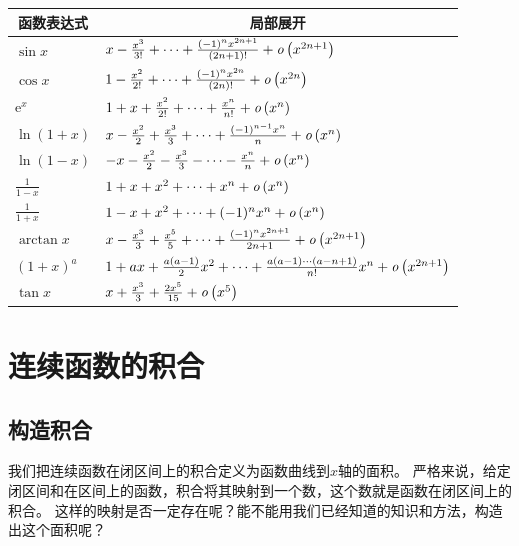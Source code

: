 \documentclass[12pt,UTF8,fontset=none]{ctexbook}
\begin{document}
\begin{appendix}
\begin{center}
    \renewcommand{\arraystretch}{2}
    \setlength{\extrarowheight}{-3pt}
    \begin{longtable}{|l|l|}
        \hline \multicolumn{1}{|c|}{\textbf{函数表达式}} & \multicolumn{1}{c|}{\textbf{局部展开}} \\[4pt] 
        \hline    
        $\sin{x}$ & $x - \frac{x^3}{3!} + \cdots + \frac{(-1)^n x^{2n+1}}{(2n+1)!} + \mathit{o}\left(x^{2n+1}\right) $ \\[4pt]
        \hline
        $\cos{x}$ & $1 - \frac{x^2}{2!} + \cdots + \frac{(-1)^n x^{2n}}{(2n)!} + \mathit{o}\left(x^{2n}\right) $ \\[4pt]
        \hline
        $\mathrm{e}^x$ & $1 + x + \frac{x^2}{2!} + \cdots + \frac{x^n}{n!} + \mathit{o}\left(x^n\right)$ \\[4pt]
        \hline
        $\ln{(1 + x)}$ & $x - \frac{x^2}{2} + \frac{x^3}{3} + \cdots + \frac{(-1)^{n-1}x^{n}}{n} + \mathit{o}\left(x^{n}\right)$ \\[4pt]  
        \hline
        $\ln{(1 - x)}$ & $- x - \frac{x^2}{2} - \frac{x^3}{3} - \cdots - \frac{x^{n}}{n} + \mathit{o}\left(x^{n}\right)$ \\[4pt]  
        \hline
        $\frac{1}{1 - x}$ & $1 + x + x^2 + \cdots + x^n + \mathit{o}\left(x^{n}\right)$ \\[4pt]  
        \hline
        $\frac{1}{1 + x}$ & $1 - x + x^2 + \cdots + (-1)^n x^n + \mathit{o}\left(x^{n}\right)$ \\[4pt]  
        \hline
        $\arctan{x}$ & $x - \frac{x^3}{3} + \frac{x^5}{5} + \cdots + \frac{(-1)^n x^{2n+1}}{2n+1} + \mathit{o}\left(x^{2n+1}\right)$ \\[4pt]  
        \hline
        $(1 + x)^a$ & $1 + ax + \frac{a(a - 1)}{2}x^2 + \cdots + \frac{a(a - 1)\cdots(a - n + 1)}{n!}x^n + \mathit{o}\left(x^{2n+1}\right)$ \\[4pt] 
        \hline
        $\tan{x}$ & $x + \frac{x^3}{3} + \frac{2x^5}{15} + \mathit{o}\left(x^{5}\right)$ \\[4pt]
        \hline
    \end{longtable}
\end{center}

\chapter{连续函数的积合}

\section{构造积合}

我们把连续函数在闭区间上的积合定义为函数曲线到$x$轴的面积。
严格来说，给定闭区间和在区间上的函数，积合将其映射到一个数，这个数就是函数在闭区间上的积合。
这样的映射是否一定存在呢？能不能用我们已经知道的知识和方法，构造出这个面积呢？


\end{appendix}
\end{document}
